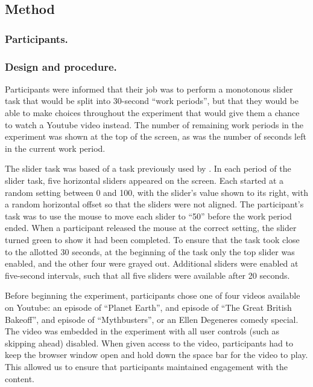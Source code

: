 \documentclass[10pt,letterpaper]{article}
\begin{document}
\subsection{Method}

\subsubsection{Participants.}

\subsubsection{Design and procedure.}

Participants were informed that their job was to perform a monotonous slider task that
would be split into 30-second ``work periods'', but that they would be able to
make choices throughout the experiment that would give them a chance to watch a
Youtube video instead. The number of remaining work periods in the experiment was shown
at the top of the screen, as was the number of seconds left in the current work period.

The slider task was based of a task previously used by \citet{Gill2012}. In each
period of the slider task, five horizontal sliders appeared on the screen. Each
started at a random setting between 0 and 100, with the slider's value
shown to its right, with a random horizontal offset so that the
sliders were not aligned. The participant's task was to use the mouse to move
each slider to ``50'' before the work period ended. When a participant released
the mouse at the correct setting, the slider turned green to show it had been
completed. To ensure that the task took close to the allotted 30 seconds, at the
beginning of the task only the top slider was enabled, and the other four were
grayed out. Additional sliders were enabled at five-second intervals, such that
all five sliders were available after 20 seconds.

Before beginning the experiment, participants chose one of four videos available
on Youtube: an episode of ``Planet Earth'', and episode of ``The Great British
Bakeoff'', and episode of ``Mythbusters'', or an Ellen Degeneres comedy special.
The video was embedded in the experiment with all user controls (such as
skipping ahead) disabled. When given access to the video, participants had to keep the
browser window open and hold down the space bar for the video to play. This allowed us to ensure that
participants maintained engagement with the content.
\end{document}
